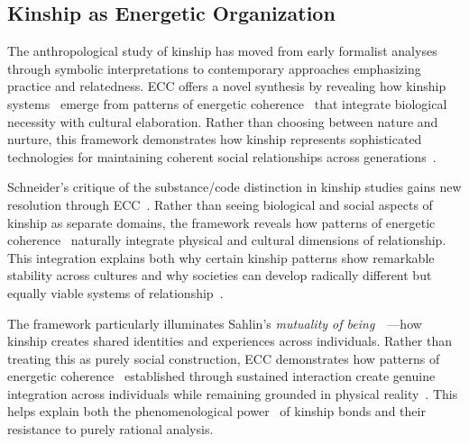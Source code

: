 \subsection*{Kinship as Energetic Organization}

The anthropological study of kinship has moved from early formalist analyses through symbolic interpretations to contemporary approaches emphasizing practice and relatedness. ECC offers a novel synthesis by revealing how kinship systems~ emerge from patterns of energetic coherence~ that integrate biological necessity with cultural elaboration. Rather than choosing between nature and nurture, this framework demonstrates how kinship represents sophisticated technologies for maintaining coherent social relationships across generations~\cite{carsten2004after,strathern2004partial}.

Schneider's critique of the substance/code distinction in kinship studies gains new resolution through ECC~\cite{schneider1984critique}. Rather than seeing biological and social aspects of kinship as separate domains, the framework reveals how patterns of energetic coherence~ naturally integrate physical and cultural dimensions of relationship. This integration explains both why certain kinship patterns show remarkable stability across cultures and why societies can develop radically different but equally viable systems of relationship~\cite{descola2005beyond}.

The framework particularly illuminates Sahlin's \textit{mutuality of being}~~\cite{sahlins2013what}—how kinship creates shared identities and experiences across individuals. Rather than treating this as purely social construction, ECC demonstrates how patterns of energetic coherence~ established through sustained interaction create genuine integration across individuals while remaining grounded in physical reality~\cite{csordas1994embodiment}. This helps explain both the phenomenological power~ of kinship bonds and their resistance to purely rational analysis.

